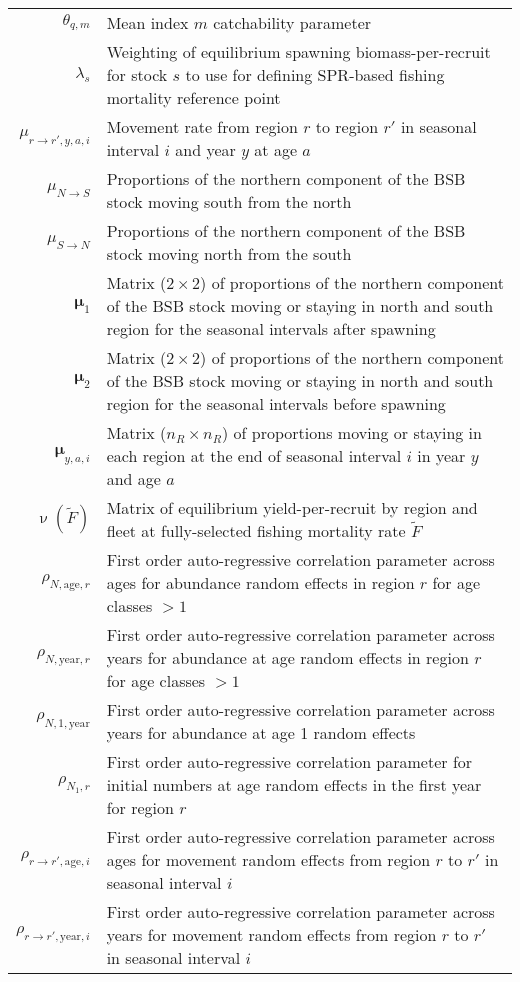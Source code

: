 \begin{longtable}[c]{r p{}}
$\theta_{q,m}$ & Mean index $m$ catchability parameter\\
$\lambda_s$ & Weighting of equilibrium spawning biomass-per-recruit for stock $s$ to use for defining SPR-based fishing mortality reference point\\
$\mu_{r\rightarrow r',y,a,i}$ & Movement rate from region $r$ to region $r'$ in seasonal interval $i$ and year $y$ at age $a$\\
$\mu_{N\rightarrow S}$ & Proportions of the northern component of the BSB stock moving south from the north\\
$\mu_{S\rightarrow N}$ & Proportions of the northern component of the BSB stock moving north from the south\\
$\boldsymbol{\mu}_{1}$ & Matrix ($2 \times 2$) of proportions of the northern component of the BSB stock moving or staying in north and south region for the seasonal intervals after spawning\\
$\boldsymbol{\mu}_{2}$ & Matrix ($2 \times 2$) of proportions of the northern component of the BSB stock moving or staying in north and south region for the seasonal intervals before spawning\\
$\boldsymbol{\mu}_{y,a,i}$ & Matrix ($n_R \times n_R$) of proportions moving or staying in each region at the end of seasonal interval $i$ in year $y$ and age $a$ \\
$\upnu(\widetilde{F})$ & Matrix of equilibrium yield-per-recruit by region and fleet at fully-selected fishing mortality rate $\widetilde{F}$\\
$\rho_{N,\text{age},r}$ & First order auto-regressive correlation parameter across ages for abundance random effects in region $r$ for age classes $>1$\\
$\rho_{N,\text{year},r}$ & First order auto-regressive correlation parameter across years for abundance at age random effects in region $r$ for age classes $>1$\\
$\rho_{N,1,\text{year}}$ & First order auto-regressive correlation parameter across years for abundance at age 1 random effects\\
$\rho_{N_1,r}$ & First order auto-regressive correlation parameter for initial numbers at age random effects in the first year for region $r$\\
$\rho_{r \rightarrow r',\text{age},i}$ & First order auto-regressive correlation parameter across ages for movement random effects from region $r$ to $r'$ in seasonal interval $i$\\
$\rho_{r \rightarrow r',\text{year},i}$ & First order auto-regressive correlation parameter across years for movement random effects from region $r$ to $r'$ in seasonal interval $i$\\

\end{longtable}
